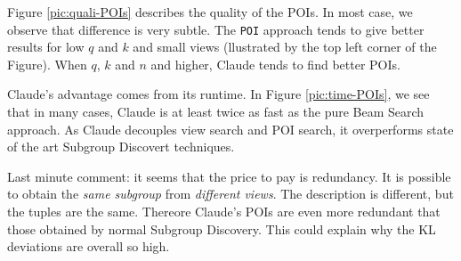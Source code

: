 Figure \ref{pic:quali-POIs} describes the quality of the POIs. In most case, we
observe that difference is very subtle. The \texttt{POI} approach tends to give
better results for low $q$ and $k$ and small views (llustrated by the top left
corner of the Figure). When $q$, $k$ and $n$ and higher, Claude tends to find
better POIs.

Claude's advantage comes from its runtime. In Figure \ref{pic:time-POIs}, we
see that in many cases, Claude is at least twice as fast as the pure Beam
Search approach. As Claude decouples view search and POI search, it
overperforms state of the art Subgroup Discovert techniques.

Last minute comment: it seems that the price to pay is redundancy. It is
possible to obtain the \emph{same subgroup} from \emph{different views}. The
description is different, but the tuples are the same. Thereore Claude's POIs
are even more redundant that those obtained by normal Subgroup Discovery.  This
could explain why the KL deviations are overall so high.
